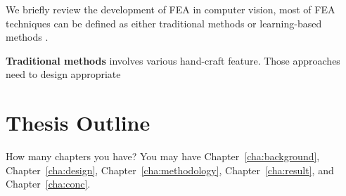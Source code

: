 We briefly review the development of FEA in computer vision, most of FEA techniques can be defined as either traditional methods or learning-based methods \citep{huangFacialExpressionRecognition2019}.

\textbf{Traditional methods} involves various hand-craft feature. Those approaches need to design appropriate 

\section{Thesis Outline}
\label{sec:outline}
How many chapters you have? You may have Chapter~\ref{cha:background},
Chapter~\ref{cha:design}, Chapter~\ref{cha:methodology},
Chapter~\ref{cha:result}, and Chapter~\ref{cha:conc}.
